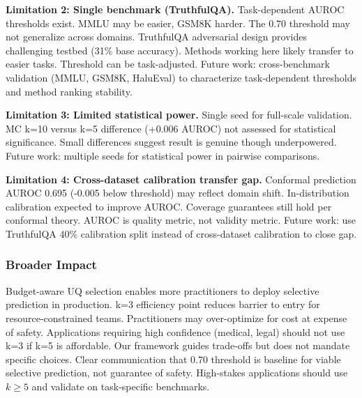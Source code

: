 \textbf{Limitation 2: Single benchmark (TruthfulQA).} Task-dependent AUROC thresholds exist. MMLU may be easier, GSM8K harder. The 0.70 threshold may not generalize across domains. TruthfulQA adversarial design provides challenging testbed (31\% base accuracy). Methods working here likely transfer to easier tasks. Threshold can be task-adjusted. Future work: cross-benchmark validation (MMLU, GSM8K, HaluEval) to characterize task-dependent thresholds and method ranking stability.

\textbf{Limitation 3: Limited statistical power.} Single seed for full-scale validation. MC k=10 versus k=5 difference (+0.006 AUROC) not assessed for statistical significance. Small differences suggest result is genuine though underpowered. Future work: multiple seeds for statistical power in pairwise comparisons.

\textbf{Limitation 4: Cross-dataset calibration transfer gap.} Conformal prediction AUROC 0.695 (-0.005 below threshold) may reflect domain shift. In-distribution calibration expected to improve AUROC. Coverage guarantees still hold per conformal theory. AUROC is quality metric, not validity metric. Future work: use TruthfulQA 40\% calibration split instead of cross-dataset calibration to close gap.

\subsubsection{Broader Impact}

Budget-aware UQ selection enables more practitioners to deploy selective prediction in production. k=3 efficiency point reduces barrier to entry for resource-constrained teams. Practitioners may over-optimize for cost at expense of safety. Applications requiring high confidence (medical, legal) should not use k=3 if k=5 is affordable. Our framework guides trade-offs but does not mandate specific choices. Clear communication that 0.70 threshold is baseline for viable selective prediction, not guarantee of safety. High-stakes applications should use $k\geq 5$ and validate on task-specific benchmarks.
